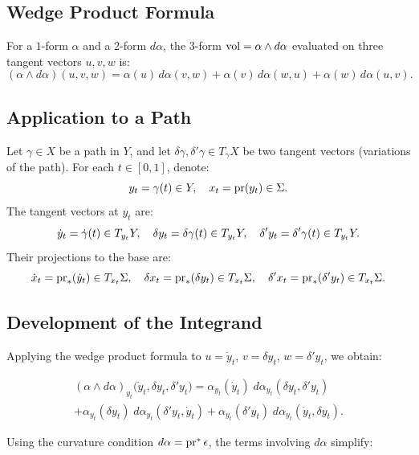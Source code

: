 \documentclass[11pt,reqno,letterpaper,twoside]{amsart}
\begin{document}
  \subsection{Wedge Product Formula}
  
  For a $1$-form $\alpha$ and a $2$-form $d\alpha$,
  the $3$-form $\mathrm{vol} = \alpha \wedge d\alpha$ evaluated on three tangent vectors $u, v, w$ is:
  \[
    (\alpha \wedge d\alpha)(u, v, w)
    = \alpha(u) \, d\alpha(v, w)
    + \alpha(v) \, d\alpha(w, u)
    + \alpha(w) \, d\alpha(u, v).
    \]
  
  \subsection{Application to a Path}
  
  Let $\gamma \in X$ be a path in $Y$,
  and let $\delta\gamma, \delta'\gamma \in T_\gamma X$ be two tangent vectors (variations of the path).
  For each $t \in [0,1]$,
  denote:
  \[
    y_t = \gamma(t) \in Y,
    \quad
    x_t = \pr(y_t) \in \Sigma.
    \]
  The tangent vectors at $y_t$ are:
  \[
    \dot y_t = \dot\gamma(t) \in T_{y_t}Y,
    \quad
    \delta y_t = \delta\gamma(t) \in T_{y_t}Y,
    \quad
    \delta' y_t = \delta'\gamma(t) \in T_{y_t}Y.
    \]
  Their projections to the base are:
  \[
    \dot x_t = \pr_*(\dot y_t) \in \Tgt_{x_t}\Sigma,
    \quad
    \delta x_t = \pr_*(\delta y_t) \in \Tgt_{x_t}\Sigma,
    \quad
    \delta' x_t = \pr_*(\delta' y_t) \in \Tgt_{x_t}\Sigma.
    \]
  
  \subsection{Development of the Integrand}
  
  Applying the wedge product formula to
  $u = \dot y_t$,
  $v = \delta y_t$,
  $w = \delta' y_t$,
  we obtain:
  
  \begin{multline*}
    (\alpha \wedge d\alpha)_{y_t}\bigl( \dot y_t, \delta y_t, \delta' y_t \bigr)
    = \alpha_{y_t}(\dot y_t) \; d\alpha_{y_t}(\delta y_t, \delta' y_t) \\
    + \alpha_{y_t}(\delta y_t) \; d\alpha_{y_t}(\delta' y_t, \dot y_t)
    + \alpha_{y_t}(\delta' y_t) \; d\alpha_{y_t}(\dot y_t, \delta y_t).
  \end{multline*}
  
  Using the curvature condition $d\alpha = \pr^*\epsilon$,
  the terms involving $d\alpha$ simplify:
  
\end{document}
